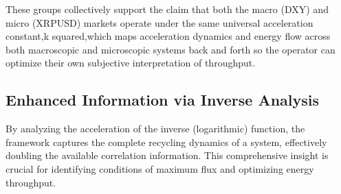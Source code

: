 \documentclass{article}
\begin{document}
These groups collectively support the claim that both the macro (DXY) and micro (XRPUSD) markets operate under the same universal acceleration constant,k squared,which maps acceleration dynamics and energy flow across both macroscopic and microscopic systems back and forth so the operator can optimize their own subjective interpretation of throughput.

\subsection{Enhanced Information via Inverse Analysis}
By analyzing the acceleration of the inverse (logarithmic) function, the framework captures the complete recycling dynamics of a system, effectively doubling the available correlation information. This comprehensive insight is crucial for identifying conditions of maximum flux and optimizing energy throughput.
\end{document}
